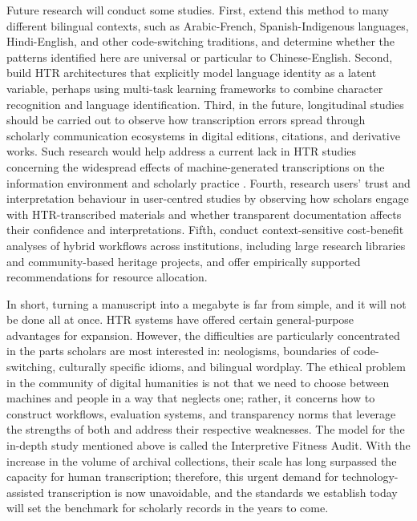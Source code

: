 \documentclass[final]{anthology-ch} %
\begin{document}
Future research will conduct some studies. First, extend this method to many different bilingual contexts, such as Arabic-French, Spanish-Indigenous languages, Hindi-English, and other code-switching traditions, and determine whether the patterns identified here are universal or particular to Chinese-English. Second, build HTR architectures that explicitly model language identity as a latent variable, perhaps using multi-task learning frameworks to combine character recognition and language identification. Third, in the future, longitudinal studies should be carried out to observe how transcription errors spread through scholarly communication ecosystems in digital editions, citations, and derivative works. Such research would help address a current lack in HTR studies concerning the widespread effects of machine-generated transcriptions on the information environment and scholarly practice \cite{nockels2022understanding}. Fourth, research users' trust and interpretation behaviour in user-centred studies by observing how scholars engage with HTR-transcribed materials and whether transparent documentation affects their confidence and interpretations. Fifth, conduct context-sensitive cost-benefit analyses of hybrid workflows across institutions, including large research libraries and community-based heritage projects, and offer empirically supported recommendations for resource allocation.

In short, turning a manuscript into a megabyte is far from simple, and it will not be done all at once. HTR systems have offered certain general-purpose advantages for expansion. However, the difficulties are particularly concentrated in the parts scholars are most interested in: neologisms, boundaries of code-switching, culturally specific idioms, and bilingual wordplay. The ethical problem in the community of digital humanities is not that we need to choose between machines and people in a way that neglects one; rather, it concerns how to construct workflows, evaluation systems, and transparency norms that leverage the strengths of both and address their respective weaknesses. The model for the in-depth study mentioned above is called the Interpretive Fitness Audit. With the increase in the volume of archival collections, their scale has long surpassed the capacity for human transcription; therefore, this urgent demand for technology-assisted transcription is now unavoidable, and the standards we establish today will set the benchmark for scholarly records in the years to come.

\printbibliography
\end{document}
